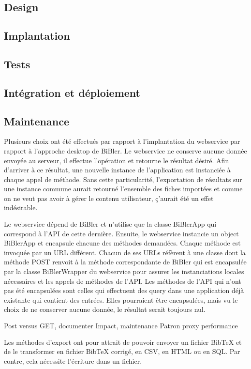 \documentclass[a4paper,12pt,titlepage]{article}
\begin{document}
\subsection{Design}
\subsection{Implantation}
\subsection{Tests}
\subsection{Intégration et déploiement}
\subsection{Maintenance}
Plusieurs choix ont été effectués par rapport à l'implantation du webservice par rapport à l'approche desktop de BiBler. Le webservice ne conserve aucune donnée envoyée au serveur, il effectue l'opération et retourne le résultat désiré. Afin d'arriver à ce résultat, une nouvelle instance de l'application est instanciée à chaque appel de méthode. Sans cette particularité, l'exportation de résultats sur une instance commune aurait retourné l'ensemble des fiches importées et comme on ne veut pas avoir à gérer le contenu utilisateur, ç'aurait été un effet indésirable. \newline

Le webservice dépend de BiBler et n'utilise que la classe BiBlerApp qui correspond à l'API de cette dernière. Ensuite, le webservice instancie un object BiBlerApp et encapsule chacune des méthodes demandées. Chaque méthode est invoquée par un URL différent. Chacun de ses URLs réfèrent à une classe dont la méthode POST renvoit à la méthode correspondante de BiBler qui est encapsulée par la classe BiBlerWrapper du webservice pour assurer les instanciations locales nécessaires et les appels de méthodes de l'API. Les méthodes de l'API qui n'ont pas été encapsulées sont celles qui effectuent des query dans une application déjà existante qui contient des entrées. Elles pourraient être encapsulées, mais vu le choix de ne conserver aucune donnée, le résultat serait toujours nul. \newline

Post versus GET, documenter
Impact, maintenance
Patron proxy
performance


Les méthodes d'export ont pour attrait de pouvoir envoyer un fichier BibTeX et de le transformer en fichier BibTeX corrigé, en CSV, en HTML ou en SQL. Par contre, cela nécessite l'écriture dans un fichier.\newline
\end{document}
